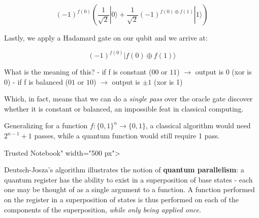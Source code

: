 \documentclass[11pt]{article}
\begin{document}
\[(-1)^{f(0)}(\frac{1}{\sqrt{2}} | 0 \rangle + \frac{1}{\sqrt{2}} (-1)^{f(0) \oplus f(1)} | 1 \rangle)\]

Lastly, we apply a Hadamard gate on our qubit and we arrive at:

\[(-1)^{f(0)} |f(0) \oplus f(1)\rangle\]

What is the meaning of this? - if f is constant (\(00\) or \(11\))
\(\rightarrow\) output is \(0\) (xor is 0) - if f is balanced (\(01\) or
\(10\)) \(\rightarrow\) output is \(\pm 1\) (xor is 1)

Which, in fact, means that we can do a \emph{single pass} over the
oracle gate discover whether it is constant or balanced, an impossible
feat in classical computing.

    Generalizing for a function \(f: \{0,1\}^n \rightarrow \{0,1\}\), a
classical algorithm would need \(2^{n-1}+1\) passes, while a quantum
function would still require 1 pass.

 Trusted Notebook" width="500 px"\textgreater{}

Deutsch-Josza's algorithm illustrates the notion of \textbf{quantum
parallelism}: a quantum register has the ability to exist in a
superposition of base states - each one may be thought of as a single
argument to a function. A function performed on the register in a
superposition of states is thus performed on each of the components of
the superposition, \emph{while only being applied once}.
\end{document}
